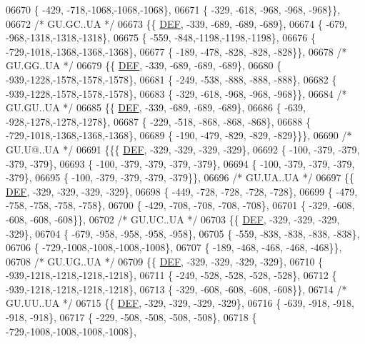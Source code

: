 \begin{DoxyCode}
06670 \{ -429, -718,-1068,-1068,-1068\},
06671 \{ -329, -618, -968, -968, -968\}\},
06672 \textcolor{comment}{/* GU.GC..UA */}
06673 \{\{  \mbox{\hyperlink{1_88_84__epars_8h_a397419fc12b37ed479c8abb9d444d843}{DEF}}, -339, -689, -689, -689\},
06674 \{ -679, -968,-1318,-1318,-1318\},
06675 \{ -559, -848,-1198,-1198,-1198\},
06676 \{ -729,-1018,-1368,-1368,-1368\},
06677 \{ -189, -478, -828, -828, -828\}\},
06678 \textcolor{comment}{/* GU.GG..UA */}
06679 \{\{  \mbox{\hyperlink{1_88_84__epars_8h_a397419fc12b37ed479c8abb9d444d843}{DEF}}, -339, -689, -689, -689\},
06680 \{ -939,-1228,-1578,-1578,-1578\},
06681 \{ -249, -538, -888, -888, -888\},
06682 \{ -939,-1228,-1578,-1578,-1578\},
06683 \{ -329, -618, -968, -968, -968\}\},
06684 \textcolor{comment}{/* GU.GU..UA */}
06685 \{\{  \mbox{\hyperlink{1_88_84__epars_8h_a397419fc12b37ed479c8abb9d444d843}{DEF}}, -339, -689, -689, -689\},
06686 \{ -639, -928,-1278,-1278,-1278\},
06687 \{ -229, -518, -868, -868, -868\},
06688 \{ -729,-1018,-1368,-1368,-1368\},
06689 \{ -190, -479, -829, -829, -829\}\}\},
06690 \textcolor{comment}{/* GU.U@..UA */}
06691 \{\{\{  \mbox{\hyperlink{1_88_84__epars_8h_a397419fc12b37ed479c8abb9d444d843}{DEF}}, -329, -329, -329, -329\},
06692 \{ -100, -379, -379, -379, -379\},
06693 \{ -100, -379, -379, -379, -379\},
06694 \{ -100, -379, -379, -379, -379\},
06695 \{ -100, -379, -379, -379, -379\}\},
06696 \textcolor{comment}{/* GU.UA..UA */}
06697 \{\{  \mbox{\hyperlink{1_88_84__epars_8h_a397419fc12b37ed479c8abb9d444d843}{DEF}}, -329, -329, -329, -329\},
06698 \{ -449, -728, -728, -728, -728\},
06699 \{ -479, -758, -758, -758, -758\},
06700 \{ -429, -708, -708, -708, -708\},
06701 \{ -329, -608, -608, -608, -608\}\},
06702 \textcolor{comment}{/* GU.UC..UA */}
06703 \{\{  \mbox{\hyperlink{1_88_84__epars_8h_a397419fc12b37ed479c8abb9d444d843}{DEF}}, -329, -329, -329, -329\},
06704 \{ -679, -958, -958, -958, -958\},
06705 \{ -559, -838, -838, -838, -838\},
06706 \{ -729,-1008,-1008,-1008,-1008\},
06707 \{ -189, -468, -468, -468, -468\}\},
06708 \textcolor{comment}{/* GU.UG..UA */}
06709 \{\{  \mbox{\hyperlink{1_88_84__epars_8h_a397419fc12b37ed479c8abb9d444d843}{DEF}}, -329, -329, -329, -329\},
06710 \{ -939,-1218,-1218,-1218,-1218\},
06711 \{ -249, -528, -528, -528, -528\},
06712 \{ -939,-1218,-1218,-1218,-1218\},
06713 \{ -329, -608, -608, -608, -608\}\},
06714 \textcolor{comment}{/* GU.UU..UA */}
06715 \{\{  \mbox{\hyperlink{1_88_84__epars_8h_a397419fc12b37ed479c8abb9d444d843}{DEF}}, -329, -329, -329, -329\},
06716 \{ -639, -918, -918, -918, -918\},
06717 \{ -229, -508, -508, -508, -508\},
06718 \{ -729,-1008,-1008,-1008,-1008\},

\end{DoxyCode}
